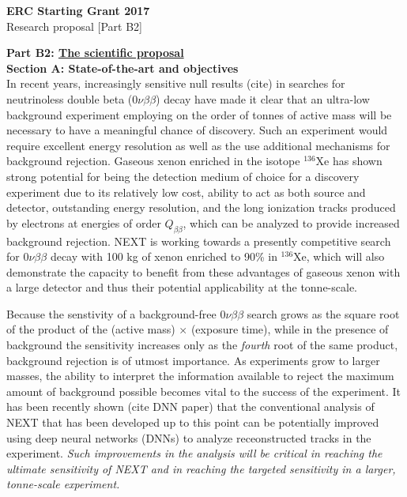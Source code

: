 \documentclass[11pt,a4paper]{article}
\begin{document}


\begin{center}
	\large
	\textbf{ERC Starting Grant 2017}\\
	Research proposal [Part B2]\\[2.0\baselineskip]
\end{center}

\noindent\textbf{Part B2: \underline{The scientific proposal}}\\

{\noindent\textbf{Section A: State-of-the-art and objectives}}\\
In recent years, increasingly sensitive null results (cite) in searches for neutrinoless double beta ($0\nu\beta\beta$) decay have made it clear that an ultra-low background experiment 
employing on the order of tonnes of active mass will be necessary to have a meaningful chance of discovery.  Such an experiment would require excellent energy resolution as well as the use
additional mechanisms for background rejection.  Gaseous xenon enriched in the isotope $^{136}$Xe has shown strong potential for being the 
detection medium of choice for a discovery experiment due to its relatively low cost, ability to act as both source and detector, outstanding energy resolution, and the long ionization 
tracks produced by electrons at energies of order $Q_{\beta\beta}$, which can be analyzed to provide increased background rejection.  NEXT is working towards a presently competitive search 
for $0\nu\beta\beta$ decay with 100 kg of xenon enriched to 90\% in $^{136}$Xe, which will also demonstrate the capacity to benefit from these advantages of gaseous xenon with a 
large detector and thus their potential applicability at the tonne-scale.

Because the senstivity of a background-free $0\nu\beta\beta$ search grows as the square root of the product of the (active mass) $\times$ (exposure time), while in the presence of background the sensitivity increases only as the \emph{fourth} root of the same product, background rejection is of utmost importance. As experiments grow to larger masses, the ability to interpret the information available to reject the maximum amount of background possible becomes vital to the success of the experiment.  It has been recently shown (cite DNN paper) that the conventional analysis of NEXT that has been developed up to this point can be potentially improved using deep neural networks (DNNs) to analyze receonstructed tracks in the experiment. \emph{Such improvements in the analysis will be critical in reaching the ultimate sensitivity of NEXT and in reaching the targeted sensitivity in a larger, tonne-scale experiment.}\\
\end{document}
